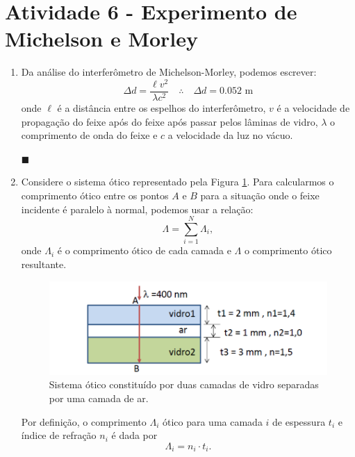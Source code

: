 \documentclass[12pt,a4paper]{article}
\begin{document}
\section*{Atividade 6 - Experimento de Michelson e Morley}
\begin{enumerate}[label = \alph*)]
    \item Da análise do interferômetro de Michelson-Morley, podemos escrever:
    \begin{equation}\label{eq:Atv6a-1}
        \Delta d=\frac{\ell v^2}{\lambda c^2}\quad\therefore\quad\boxed{\Delta d=0.052\text{ m}}
    \end{equation}
    onde $\ell$ é a distância entre os espelhos do interferômetro, $v$ é a velocidade de propagação do feixe após do feixe após passar pelos lâminas de vidro, $\lambda$ o comprimento de onda do feixe e $c$ a velocidade da luz no vácuo.
    \begin{flushright}
        $\blacksquare$
    \end{flushright}



    \item  Considere o sistema ótico representado pela Figura \ref{fig:fig1}. Para calcularmos o comprimento ótico entre os pontos $A$ e $B$ para a situação onde o feixe incidente é paralelo à normal, podemos usar a relação:
    \begin{equation}\label{eq:Atv6b-1}
        \Lambda=\sum_{i=1}^{N}\Lambda_{i},
    \end{equation}
    onde $\Lambda_i$ é o comprimento ótico de cada camada e $\Lambda$ o comprimento ótico resultante.

    \begin{figure}[h!]
     \centering
    \includegraphics[width=0.7\linewidth]{Figures/Comprimento otico.png}
     \caption{Sistema ótico constituído por duas camadas de vidro separadas por uma camada de ar.}
     \label{fig:fig1}
     \end{figure}

    Por definição, o comprimento $\Lambda_i$ ótico para uma camada $i$ de espessura $t_i$ e índice de refração $n_i$ é dada por
    \begin{equation}\label{eq:Atv6b-2}
        \Lambda_i=n_i\cdot t_i.
    \end{equation}


\end{enumerate}
\end{document}
